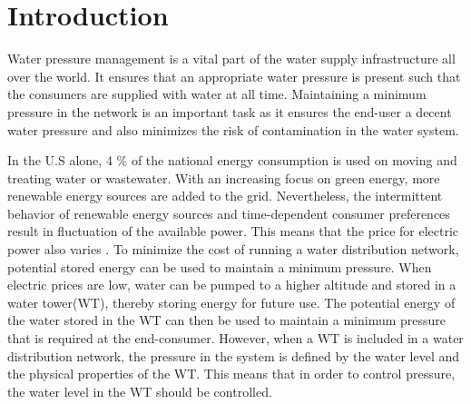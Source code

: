 \chapter{Introduction}
\label{introduction}

Water pressure management is a vital part of the water supply infrastructure all over the world. It ensures that an appropriate water pressure is present such that the consumers are supplied with water at all time. Maintaining a minimum pressure in the network is an important task as it ensures the end-user a decent water pressure and also minimizes the risk of contamination in the water system\cite{national2005public}.

In the U.S alone, 4 \% of the national energy consumption is used on moving and treating water or wastewater\cite{appelbaum2002water}. %
%
%
With an increasing focus on green energy, more renewable energy sources are added to the grid. Nevertheless, the intermittent behavior of renewable energy sources and time-dependent consumer preferences result in fluctuation of the available power.
This means that the price for electric power also varies \cite{fluctuating_price}. To minimize the cost of running a water distribution network, potential stored energy can be used to maintain a minimum pressure. When electric prices are low, water can be pumped to a higher altitude and stored in a water tower(WT), thereby storing energy for future use. The potential energy of the water stored in the WT can then be used to maintain a minimum pressure that is required at the end-consumer. However, when a WT is included in a water distribution network, the pressure in the system is defined by the water level and the physical properties of the WT. This means that in order to control pressure, the water level in the WT should be controlled.  

